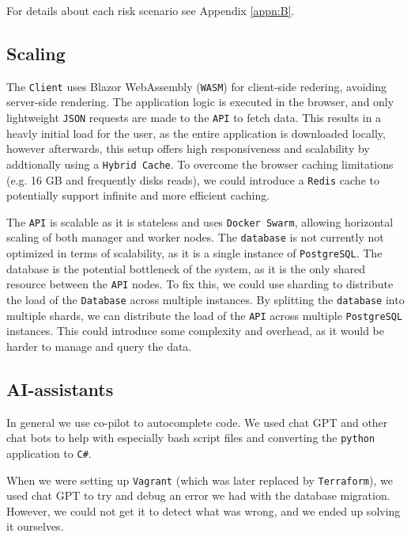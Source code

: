 For details about each risk scenario see Appendix \ref{appn:B}.

\subsection{Scaling}
The \texttt{Client} uses Blazor WebAssembly (\texttt{WASM}) for client-side redering, 
avoiding server-side rendering.
The application logic is executed in the browser, and only lightweight 
\texttt{JSON} requests are made to the \texttt{API} to fetch data.
This results in a heavly initial load for the user, as the entire application is downloaded 
locally, however afterwards, 
this setup offers high responsiveness and scalability by addtionally using 
a \texttt{Hybrid Cache}.
To overcome the browser caching limitations (e.g. 16 GB and frequently disks 
reads), we could introduce a \texttt{Redis} cache to potentially support 
infinite and more efficient caching.

The \texttt{API} is scalable as it is stateless and uses \texttt{Docker Swarm}, 
allowing horizontal scaling of both manager and worker nodes.
The \texttt{database} is not currently not optimized in terms of scalability, 
as it is a single instance of \texttt{PostgreSQL}.
The database is the potential bottleneck of the system, as it is the only shared 
resource between the \texttt{API} nodes.
To fix this, we could use sharding to distribute the load of the \texttt{Database} 
across multiple instances.
By splitting the \texttt{database} into multiple shards, we can distribute 
the load of the \texttt{API} across multiple \texttt{PostgreSQL} instances.
This could introduce some complexity and overhead, as it would be harder 
to manage and query the data.

\subsection{AI-assistants}

In general we use co-pilot to autocomplete code.
We used chat GPT and other chat bots to help
with especially bash script files and converting 
the \texttt{python} application to \texttt{C\#}.

When we were setting up \texttt{Vagrant} 
(which was later replaced by \texttt{Terraform}),
we used chat GPT to try and debug an error we had with 
the database migration. However, we could not get it 
to detect what was wrong, and we ended up solving it ourselves.
